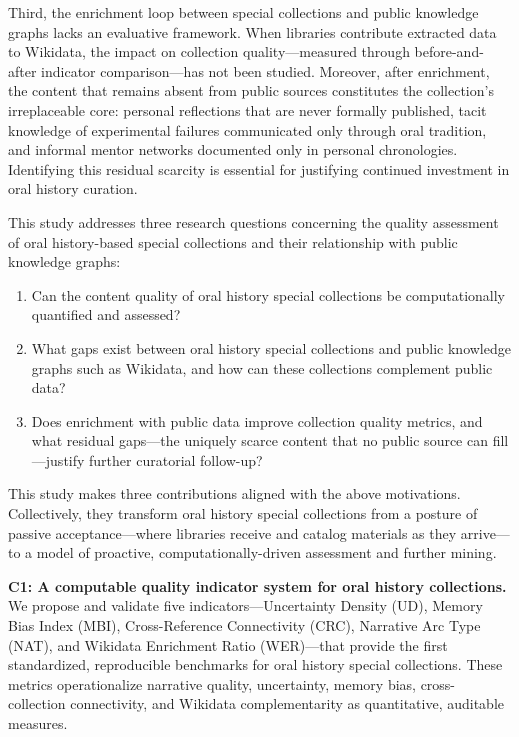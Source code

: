 \documentclass[review]{elsarticle}
\begin{document}
Third, the enrichment loop between special collections and public knowledge graphs lacks an evaluative framework. When libraries contribute extracted data to Wikidata, the impact on collection quality---measured through before-and-after indicator comparison---has not been studied. Moreover, after enrichment, the content that remains absent from public sources constitutes the collection's irreplaceable core: personal reflections that are never formally published, tacit knowledge of experimental failures communicated only through oral tradition, and informal mentor networks documented only in personal chronologies. Identifying this residual scarcity is essential for justifying continued investment in oral history curation.

This study addresses three research questions concerning the quality assessment of oral history-based special collections and their relationship with public knowledge graphs:

\begin{enumerate}[label=RQ\arabic*:,leftmargin=*]
    \item Can the content quality of oral history special collections be computationally quantified and assessed?
    \item What gaps exist between oral history special collections and public knowledge graphs such as Wikidata, and how can these collections complement public data?
    \item Does enrichment with public data improve collection quality metrics, and what residual gaps---the uniquely scarce content that no public source can fill---justify further curatorial follow-up?
\end{enumerate}

This study makes three contributions aligned with the above motivations. Collectively, they transform oral history special collections from a posture of passive acceptance—where libraries receive and catalog materials as they arrive—to a model of proactive, computationally-driven assessment and further mining.

\textbf{C1: A computable quality indicator system for oral history collections.} We propose and validate five indicators---Uncertainty Density (UD), Memory Bias Index (MBI), Cross-Reference Connectivity (CRC), Narrative Arc Type (NAT), and Wikidata Enrichment Ratio (WER)---that provide the first standardized, reproducible benchmarks for oral history special collections. These metrics operationalize narrative quality, uncertainty, memory bias, cross-collection connectivity, and Wikidata complementarity as quantitative, auditable measures.
\end{document}
